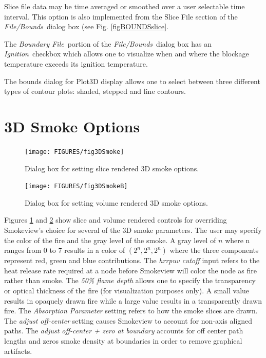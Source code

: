 \documentclass[11pt,twoside]{book}
\begin{document}
Slice file data may be time averaged or smoothed over a user
selectable time interval.  This option is also implemented from
the Slice File section of the {\em File/Bounds}\ dialog box (see
Fig. \ref{figBOUNDSslice}.

The {\em Boundary File}\ portion of the {\em File/Bounds}\ dialog
box has an {\em Ignition}\ checkbox which allows one to visualize
when and where the blockage temperature exceeds its ignition
temperature.

The bounds dialog for Plot3D display allows one to select between
three different types of contour plots:  shaded, stepped and line
contours.
\section{3D Smoke Options}
\begin{figure}[\figoptions]
\centerline{\texttt{[image: FIGURES/fig3DSmoke]}
} \caption[Dialog Box for setting slice rendered 3D smoke options]
{Dialog box for setting slice rendered 3D smoke options.   }
\label{fig3DSmoke}
\end{figure}
\begin{figure}[\figoptions]
\centerline{\texttt{[image: FIGURES/fig3DSmokeB]}
} \caption[Dialog Box for setting volume rendered 3D smoke
options] {Dialog box for setting volume rendered 3D smoke options.
} \label{fig3DSmokeB}
\end{figure}
Figures \ref{fig3DSmoke} and \ref{fig3DSmokeB} show slice and
volume rendered controls for overriding Smokeview's choice for
several of the 3D smoke parameters.  The user may specify the
color of the fire and the gray level of the smoke.  A gray level
of $n$ where n ranges from 0 to 7 results in a color of
$(2^n,2^n,2^n)$ where the three components represent red, green
and blue contributions.  The {\em hrrpuv cutoff} input refers to
the heat release rate required at a node before Smokeview will
color the node as fire rather than smoke. The {\em 50\% flame
depth} allows one to specify the transparency or optical thickness
of the fire (for visualization purposes only). A small value
results in opaquely drawn fire while a large value results in a
transparently drawn fire. The {\em Absorption Parameter} setting
refers to how the smoke slices are drawn.  The {\em adjust
off-center} setting causes Smokeview to account for non-axis
aligned paths. The {\em adjust off-center + zero at boundary}
accounts for off center path lengths and zeros smoke density at
boundaries in order to remove graphical artifacts.
\end{document}
